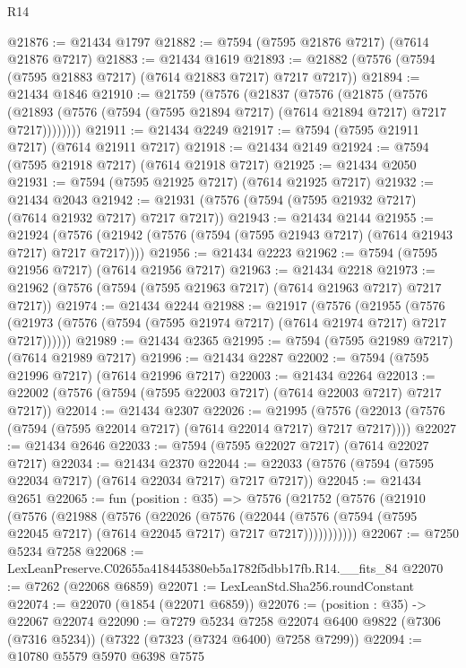\begin{lexlean}{R14}
\begin{coremodule}
@21876 := @21434 @1797
@21882 := @7594 (@7595 @21876 @7217) (@7614 @21876 @7217)
@21883 := @21434 @1619
@21893 := @21882 (@7576 (@7594 (@7595 @21883 @7217) (@7614 @21883 @7217) @7217 @7217))
@21894 := @21434 @1846
@21910 := @21759
    (@7576
      (@21837
        (@7576
          (@21875
            (@7576
              (@21893 (@7576 (@7594 (@7595 @21894 @7217) (@7614 @21894 @7217) @7217 @7217))))))))
@21911 := @21434 @2249
@21917 := @7594 (@7595 @21911 @7217) (@7614 @21911 @7217)
@21918 := @21434 @2149
@21924 := @7594 (@7595 @21918 @7217) (@7614 @21918 @7217)
@21925 := @21434 @2050
@21931 := @7594 (@7595 @21925 @7217) (@7614 @21925 @7217)
@21932 := @21434 @2043
@21942 := @21931 (@7576 (@7594 (@7595 @21932 @7217) (@7614 @21932 @7217) @7217 @7217))
@21943 := @21434 @2144
@21955 := @21924
    (@7576 (@21942 (@7576 (@7594 (@7595 @21943 @7217) (@7614 @21943 @7217) @7217 @7217))))
@21956 := @21434 @2223
@21962 := @7594 (@7595 @21956 @7217) (@7614 @21956 @7217)
@21963 := @21434 @2218
@21973 := @21962 (@7576 (@7594 (@7595 @21963 @7217) (@7614 @21963 @7217) @7217 @7217))
@21974 := @21434 @2244
@21988 := @21917
    (@7576
      (@21955
        (@7576 (@21973 (@7576 (@7594 (@7595 @21974 @7217) (@7614 @21974 @7217) @7217 @7217))))))
@21989 := @21434 @2365
@21995 := @7594 (@7595 @21989 @7217) (@7614 @21989 @7217)
@21996 := @21434 @2287
@22002 := @7594 (@7595 @21996 @7217) (@7614 @21996 @7217)
@22003 := @21434 @2264
@22013 := @22002 (@7576 (@7594 (@7595 @22003 @7217) (@7614 @22003 @7217) @7217 @7217))
@22014 := @21434 @2307
@22026 := @21995
    (@7576 (@22013 (@7576 (@7594 (@7595 @22014 @7217) (@7614 @22014 @7217) @7217 @7217))))
@22027 := @21434 @2646
@22033 := @7594 (@7595 @22027 @7217) (@7614 @22027 @7217)
@22034 := @21434 @2370
@22044 := @22033 (@7576 (@7594 (@7595 @22034 @7217) (@7614 @22034 @7217) @7217 @7217))
@22045 := @21434 @2651
@22065 := fun (position : @35) =>
  @7576
    (@21752
      (@7576
        (@21910
          (@7576
            (@21988
              (@7576
                (@22026
                  (@7576
                    (@22044
                      (@7576 (@7594 (@7595 @22045 @7217) (@7614 @22045 @7217) @7217 @7217)))))))))))
@22067 := @7250 @5234 @7258
@22068 := LexLeanPreserve.C02655a418445380eb5a1782f5dbb17fb.R14.__fits_84
@22070 := @7262 (@22068 @6859)
@22071 := LexLeanStd.Sha256.roundConstant
@22074 := @22070 (@1854 (@22071 @6859))
@22076 := (position : @35) -> @22067 @22074
@22090 := @7279
    @5234
    @7258
    @22074
    @6400
    @9822
    (@7306 (@7316 @5234))
    (@7322 (@7323 (@7324 @6400) @7258 @7299))
@22094 := @10780 @5579 @5970 @6398 @7575

\end{coremodule}
\end{lexlean}

